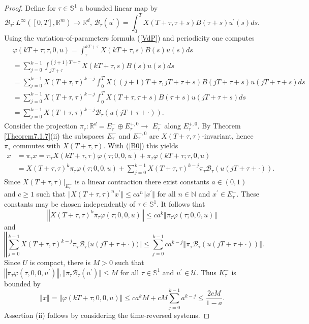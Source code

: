\documentclass{siamltex}%
\begin{document}
\begin{proof}
Define for $\tau\in\mathbb{S}^{1}$ a bounded linear map by%
\[
\mathcal{B}_{\tau}:L^{\infty}([0,T],\mathbb{R}^{m})\rightarrow\mathbb{R}%
^{d},\,\mathcal{B}_{\tau}(u^{\prime})=\int_{0}^{T}X(T+\tau,\tau+s)B(\tau
+s)u^{\prime}(s)ds.
\]
Using the variation-of-parameters formula (\ref{VdP}) and periodicity one
computes%
\begin{align*}
&  \varphi(kT+\tau;\tau,0,u)=\int_{\tau}^{kT+\tau}X(kT+\tau,s)B(s)u(s)ds\\
&  =\sum_{j=0}^{k-1}\int_{jT+\tau}^{(j+1)T+\tau}X(kT+\tau,s)B(s)u(s)ds\\
&  =\sum_{j=0}^{k-1}X(T+\tau,\tau)^{k-j}\int_{0}^{T}X((j+1)T+\tau
,jT+\tau+s)B(jT+\tau+s)u(jT+\tau+s)ds\\
&  =\sum_{j=0}^{k-1}X(T+\tau,\tau)^{k-j}\int_{0}^{T}X(T+\tau,\tau
+s)B(\tau+s)u(jT+\tau+s)ds\\
&  =\sum_{j=0}^{k-1}X(T+\tau,\tau)^{k-j}\mathcal{B}_{\tau}(u(jT+\tau+\cdot)).
\end{align*}
Consider the projection $\pi_{\tau}:\mathbb{R}^{d}=E_{\tau}^{-}\oplus E_{\tau
}^{+,0}\rightarrow$ $E_{\tau}^{-}$ along $E_{\tau}^{+,0}$. By Theorem
\ref{Theorem7.1.7}(ii) the subspaces $E_{\tau}^{-}$ and $E_{\tau}^{+,0}$ are
$X(T+\tau,\tau)$-invariant, hence $\pi_{\tau}$ commutes with $X(T+\tau,\tau)$.
With (\ref{B0}) this yields%
\begin{align*}
x  &  =\pi_{\tau}x=\pi_{\tau}X(kT+\tau,\tau)\varphi(\tau;0,0,u)+\pi_{\tau
}\varphi(kT+\tau;\tau,0,u)\\
&  =X(T+\tau,\tau)^{k}\pi_{\tau}\varphi(\tau;0,0,u)+\sum_{j=0}^{k-1}%
X(T+\tau,\tau)^{k-j}\pi_{\tau}\mathcal{B}_{\tau}(u(jT+\tau+\cdot)).
\end{align*}
Since $X(T+\tau,\tau)|_{E_{\tau}^{-}}$ is a linear contraction there exist
constants $a\in(0,1)$ and $c\geq1$ such that $\Vert X(T+\tau,\tau
)^{n}x^{\prime}\Vert\leq ca^{n}\Vert x^{\prime}\Vert$ for all $n\in\mathbb{N}$
and $x^{\prime}\in E_{\tau}^{-}$. These constants may be chosen independently
of $\tau\in\mathbb{S}^{1}$. It follows that%
\[
\left\Vert X(T+\tau,\tau)^{k}\pi_{\tau}\varphi(\tau;0,0,u)\right\Vert \leq
ca^{k}\left\Vert \pi_{\tau}\varphi(\tau;0,0,u)\right\Vert
\]
and%
\[
\left\Vert {}\right.  \sum_{j=0}^{k-1}X(T+\tau,\tau)^{k-j}\pi_{\tau
}\mathcal{B}_{\tau}(\left.  u(jT+\tau+\cdot))\right\Vert \leq\sum_{j=0}%
^{k-1}ca^{k-j}\left\Vert \pi_{\tau}\mathcal{B}_{\tau}(u(jT+\tau+\cdot
))\right\Vert .
\]
Since $U$ is compact, there is $M>0$ such that $\left\Vert \pi_{\tau}%
\varphi(\tau,0,0,u^{\prime})\right\Vert ,\Vert\pi_{\tau}\mathcal{B}_{\tau
}(u^{\prime})\Vert\leq M$ for all $\tau\in\mathbb{S}^{1}$ and $u^{\prime}%
\in\mathcal{U}$. Thus $K_{\tau}^{-}$ is bounded by
\[
\left\Vert x\right\Vert =\left\Vert \varphi(kT+\tau;0,0,u)\right\Vert \leq
ca^{k}M+cM\sum_{j=0}^{k-1}a^{k-j}\leq\dfrac{2cM}{1-a}.
\]
Assertion (ii) follows by considering the time-reversed systems.
\end{proof}
\end{document}
